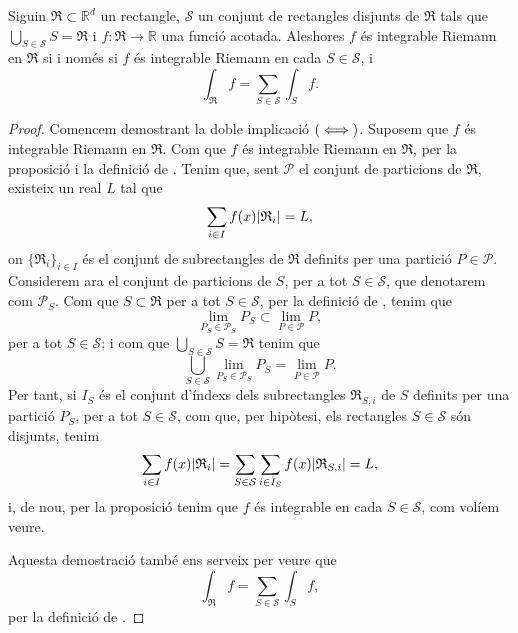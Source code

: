 \documentclass[../Apunts.tex]{subfiles}
\begin{document}
	\begin{theorem}
		\label{thm:podem partir les integrals Riemann}
		Siguin \({{\mathfrak{R}}}\subset\mathbb{R}^{d}\) un rectangle, \(\mathcal{S}\) un conjunt de rectangles disjunts de \(\mathfrak{R}\) tals que \(\bigcup_{S\in\mathcal{S}}S=\mathfrak{R}\) i \(f\colon\mathfrak{R}\to\mathbb{R}\) una funció acotada. Aleshores \(f\) és integrable Riemann en \(\mathfrak{R}\) si i només si \(f\) és integrable Riemann en cada \(S\in\mathcal{S}\), i
		\[\int_{\mathfrak{R}}f=\sum_{S\in\mathcal{S}}\int_{S}f.\]
		\begin{proof}
			Comencem demostrant la doble implicació \((\iff)\). Suposem que \(f\) és integrable Riemann en \(\mathfrak{R}\). Com que \(f\) és integrable Riemann en \(\mathfrak{R}\), per la proposició  i la definició de . Tenim que, sent \(\mathcal{P}\) el conjunt de particions de \(\mathfrak{R}\), existeix un real \(L\) tal que
			\[\sum_{i\in I}f(x)\abs{\mathfrak{R}_{i}}=L,\]
			on \(\{\mathfrak{R}_{i}\}_{i\in I}\) és el conjunt de subrectangles de \(\mathfrak{R}\) definits per una partició \(P\in\mathcal{P}\). Considerem ara el conjunt de particions de \(S\), per a tot \(S\in\mathcal{S}\), que denotarem com \(\mathcal{P}_{S}\). Com que \(S\subset\mathfrak{R}\) per a tot \(S\in\mathcal{S}\), per la definició de , tenim que
			\[\lim_{P_{S}\in\mathcal{P}_{S}}P_{S}\subset\lim_{P\in\mathcal{P}}P,\]
			per a tot \(S\in\mathcal{S}\); i com que \(\bigcup_{S\in\mathcal{S}}S=\mathfrak{R}\) tenim que
			\[\bigcup_{S\in\mathcal{S}}\lim_{P_{S}\in\mathcal{P}_{S}}P_{S}=\lim_{P\in\mathcal{P}}P.\]
			Per tant, si \(I_{S}\) és el conjunt d'índexs dels subrectangles \(\mathfrak{R}_{S,i}\) de \(S\) definits per una partició \(P_{S}\), per a tot \(S\in\mathcal{S}\), com que, per hipòtesi, els rectangles \(S\in\mathcal{S}\) són disjunts, tenim
			\[\sum_{i\in I}f(x)\abs{\mathfrak{R}_{i}}=\sum_{S\in\mathcal{S}}\sum_{i\in I_{S}}f(x)\abs{\mathfrak{R}_{S,i}}=L,\]
			i, de nou, per la proposició  tenim que \(f\) és integrable en cada \(S\in\mathcal{S}\), com volíem veure.
			
			Aquesta demostració també ens serveix per veure que
			\[\int_{\mathfrak{R}}f=\sum_{S\in\mathcal{S}}\int_{S}f,\]
			per la definició de . %
		\end{proof}
	\end{theorem}
\end{document}
